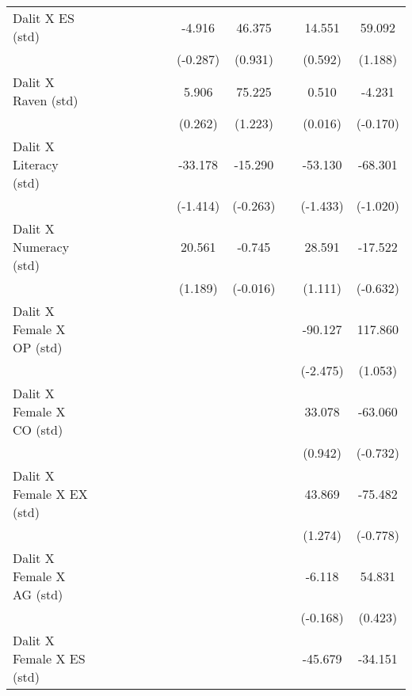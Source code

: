 {\begin{longtable}{@{\extracolsep{\fill}}lccccccccccc}
    Dalit X ES (std) &       &       &       &       &       &       & -4.916 & 46.375 &       & 14.551 & 59.092 \\
          &       &       &       &       &       &       & (-0.287) & (0.931) &       & (0.592) & (1.188) \\
    Dalit X Raven (std) &       &       &       &       &       &       & 5.906 & 75.225 &       & 0.510 & -4.231 \\
          &       &       &       &       &       &       & (0.262) & (1.223) &       & (0.016) & (-0.170) \\
    Dalit X Literacy (std) &       &       &       &       &       &       & -33.178 & -15.290 &       & -53.130 & -68.301 \\
          &       &       &       &       &       &       & (-1.414) & (-0.263) &       & (-1.433) & (-1.020) \\
    Dalit X Numeracy (std) &       &       &       &       &       &       & 20.561 & -0.745 &       & 28.591 & -17.522 \\
          &       &       &       &       &       &       & (1.189) & (-0.016) &       & (1.111) & (-0.632) \\
    Dalit X Female X OP (std) &       &       &       &       &       &       &       &       &       & -90.127 & 117.860 \\
          &       &       &       &       &       &       &       &       &       & (-2.475) & (1.053) \\
    Dalit X Female X CO (std) &       &       &       &       &       &       &       &       &       & 33.078 & -63.060 \\
          &       &       &       &       &       &       &       &       &       & (0.942) & (-0.732) \\
    Dalit X Female X EX (std) &       &       &       &       &       &       &       &       &       & 43.869 & -75.482 \\
          &       &       &       &       &       &       &       &       &       & (1.274) & (-0.778) \\
    Dalit X Female X AG (std) &       &       &       &       &       &       &       &       &       & -6.118 & 54.831 \\
          &       &       &       &       &       &       &       &       &       & (-0.168) & (0.423) \\
    Dalit X Female X ES (std) &       &       &       &       &       &       &       &       &       & -45.679 & -34.151 \\

\end{longtable}}

